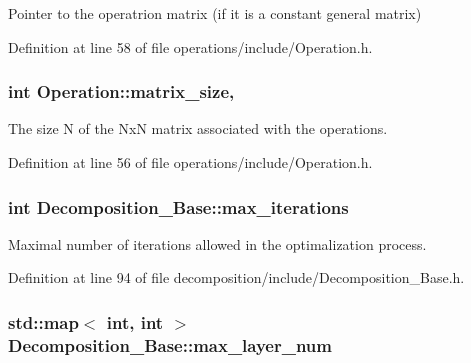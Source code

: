 Pointer to the operatrion matrix (if it is a constant general matrix) 



Definition at line 58 of file operations/include/\+Operation.\+h.

\subsubsection[{\texorpdfstring{matrix\+\_\+size}{matrix_size}}]{\setlength{\rightskip}{0pt plus 5cm}int Operation\+::matrix\+\_\+size\hspace{0.3cm}{\ttfamily [protected]}, {\ttfamily [inherited]}}\hypertarget{class_operation_a8236c07112cb165a00d3869363808624}{}\label{class_operation_a8236c07112cb165a00d3869363808624}


The size N of the NxN matrix associated with the operations. 



Definition at line 56 of file operations/include/\+Operation.\+h.

\subsubsection[{\texorpdfstring{max\+\_\+iterations}{max_iterations}}]{\setlength{\rightskip}{0pt plus 5cm}int Decomposition\+\_\+\+Base\+::max\+\_\+iterations\hspace{0.3cm}{\ttfamily [protected]}}\hypertarget{class_decomposition___base_a89e74f075626c21e23228772bf8ad395}{}\label{class_decomposition___base_a89e74f075626c21e23228772bf8ad395}


Maximal number of iterations allowed in the optimalization process. 



Definition at line 94 of file decomposition/include/\+Decomposition\+\_\+\+Base.\+h.

\subsubsection[{\texorpdfstring{max\+\_\+layer\+\_\+num}{max_layer_num}}]{\setlength{\rightskip}{0pt plus 5cm}std\+::map$<$ int, int $>$ Decomposition\+\_\+\+Base\+::max\+\_\+layer\+\_\+num\hspace{0.3cm}{\ttfamily [protected]}}\hypertarget{class_decomposition___base_a861d7b10226fc13f05c131e18c8be908}{}\label{class_decomposition___base_a861d7b10226fc13f05c131e18c8be908}


